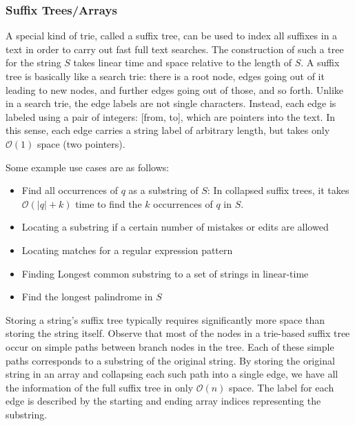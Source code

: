 \documentclass{article}
\newcommand{\bigO}{\mathcal{O}}
\begin{document}
    \subsubsection{Suffix Trees/Arrays}
    A special kind of trie, called a suffix tree, can be used to index all suffixes in a text in order to carry out fast full text searches. The construction of such a tree for the string $S$ takes linear time and space relative to the length of $S$. A suffix tree is basically like a search trie: there is a root node, edges going out of it leading to new nodes, and further edges going out of those, and so forth. Unlike in a search trie, the edge labels are not single characters. Instead, each edge is labeled using a pair of integers: [from, to], which are pointers into the text. In this sense, each edge carries a string label of arbitrary length, but takes only $\bigO(1)$ space (two pointers).
    
    Some example use cases are as follows:
    \begin{itemize}
        \item Find all occurrences of $q$ as a substring of $S$: In collapsed suffix trees, it takes $\bigO(|q| + k)$ time to find the $k$ occurrences of $q$ in $S$.
        \item Locating a substring if a certain number of mistakes or edits are allowed
        \item Locating matches for a regular expression pattern
        \item Finding Longest common substring to a set of strings in linear-time
        \item Find the longest palindrome in $S$
    \end{itemize}
    
    Storing a string's suffix tree typically requires significantly more space than storing the string itself. Observe that most of the nodes in a trie-based suffix tree occur on simple paths between branch nodes in the tree. Each of these simple paths corresponds to a substring of the original string. By storing the original string in an array and collapsing each such path into a single edge, we have all the information of the full suffix tree in only $\bigO(n)$ space. The label for each edge is described by the starting and ending array indices representing the substring. 
    
\end{document}
